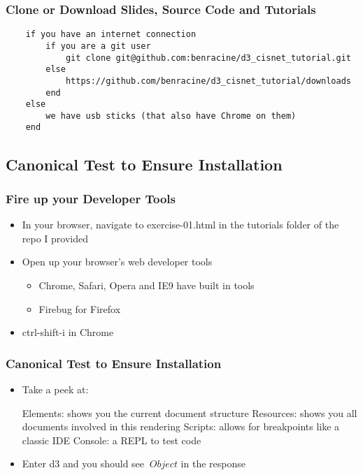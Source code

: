 \documentclass{beamer}
\begin{document}
\begin{frame}[fragile]
    \frametitle{Clone or Download Slides, Source Code and Tutorials}
        \tiny{
        \begin{verbatim}
    if you have an internet connection
        if you are a git user
            git clone git@github.com:benracine/d3_cisnet_tutorial.git
        else
            https://github.com/benracine/d3_cisnet_tutorial/downloads
        end
    else
        we have usb sticks (that also have Chrome on them)
    end
        \end{verbatim}
        }
\end{frame}



\subsection{Canonical Test to Ensure Installation}

\begin{frame}
    \frametitle{Fire up your Developer Tools}
    \begin{itemize}
\pause
    \item In your browser, navigate to exercise-01.html in the tutorials folder of the repo I provided
\pause
    \item Open up your browser's web developer tools
        \begin{itemize}
        \item Chrome, Safari, Opera and IE9 have built in tools
        \item Firebug for Firefox
        \end{itemize}
    \item ctrl-shift-i in Chrome
    \end{itemize}
\end{frame}


\begin{frame}
    \frametitle{Canonical Test to Ensure Installation}
    \begin{itemize}
    \item Take a peek at:
    \begin{itemize}
        \items Elements: shows you the current document structure
        \items Resources: shows you all documents involved in this rendering
        \items Scripts: allows for breakpoints like a classic IDE
        \items Console: a REPL to test code
    \end{itemize}
\pause
    \item Enter d3 and you should see $\> Object $ in the response
    \end{itemize}
\end{frame}
\end{document}

